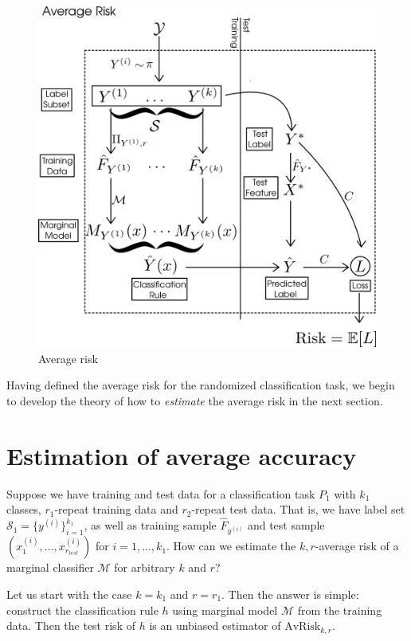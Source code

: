 \begin{figure}[h]
\centering
\includegraphics[scale = 0.3]{../extrapolation_figures/average_risk.png}
\caption{Average risk}\label{fig:average_risk}
\end{figure}

Having defined the average risk for the randomized classification
task, we begin to develop the theory of how to \emph{estimate} the
average risk in the next section.

\section{Estimation of average accuracy}\label{sec:estimation_average_accuracy}

Suppose we have training and test data for a classification task $P_1$
with $k_1$ classes, $r_1$-repeat training data and $r_2$-repeat test
data.  That is, we have label set $\mathcal{S}_1 =
\{y^{(i)}\}_{i=1}^{k_1}$, as well as training sample $\hat{F}_{y^{(i)}}$
and test sample $(x_1^{(i)},\hdots, x_{r_{test}}^{(i)})$ for $i =
1,\hdots, k_1$.  How can we estimate the $k, r$-average risk of a
marginal classifier $\mathcal{M}$ for arbitrary $k$ and $r$?

Let us start with the case $k = k_1$ and $r = r_1$.  Then the answer
is simple: construct the classification rule $h$ using marginal model
$\mathcal{M}$ from the training data.  Then the test risk of $h$ is an
unbiased estimator of $\text{AvRisk}_{k,r}$.

